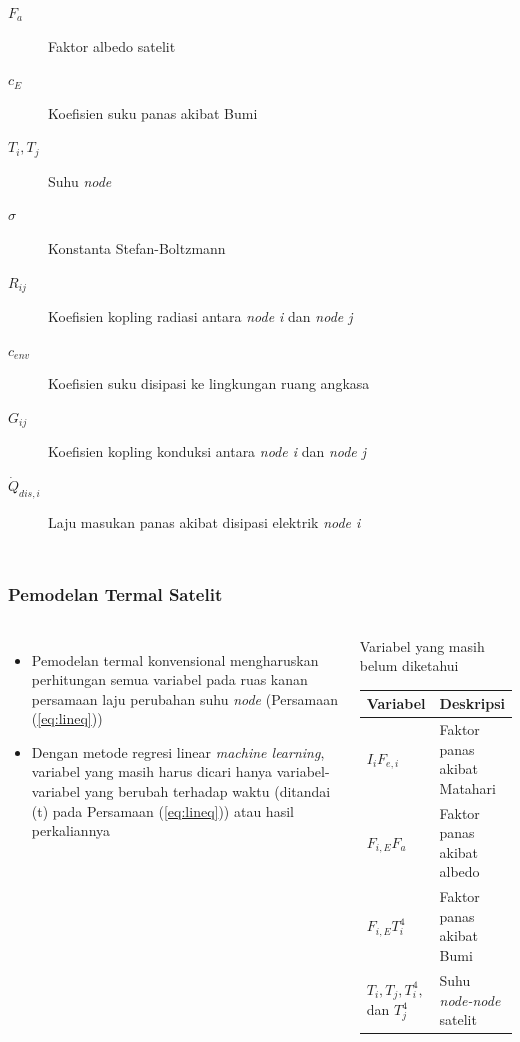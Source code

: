 \documentclass[8pt]{beamer}
\begin{document}
\begin{frame}
\begin{columns}[T]
\begin{description}
        \item[$F_{a}$] Faktor albedo satelit 
        \item[$c_{E}$] Koefisien suku panas akibat Bumi
        \item[$T_{i}, T_{j}$] Suhu \textit{node}
        \item[$\sigma$] Konstanta Stefan-Boltzmann 
        \item[$R_{ij}$] Koefisien kopling radiasi antara \textit{node i} dan \textit{node j}
        \item[$c_{env}$] Koefisien suku disipasi ke lingkungan ruang angkasa
        \item[$G_{ij}$] Koefisien kopling konduksi antara \textit{node i} dan \textit{node j}
        \item[$\dot{Q}_{dis,i}$] Laju masukan panas akibat disipasi elektrik \textit{node i}

\end{description}
  \end{columns}
\end{frame}

\begin{frame}
  \frametitle{Pemodelan Termal Satelit}
  \begin{columns}[T]
    \begin{itemize}
      \item Pemodelan termal konvensional mengharuskan perhitungan semua variabel pada ruas kanan persamaan laju perubahan suhu \textit{node} (Persamaan (\ref{eq:lineq}))
      \item Dengan metode regresi linear \textit{machine learning}, variabel yang masih harus dicari hanya variabel-variabel yang berubah terhadap waktu (ditandai (t) pada Persamaan (\ref{eq:lineq})) atau hasil perkaliannya
    \end{itemize}
    \begin{block}{\center Variabel yang masih belum diketahui}
    \begin{table}[H]
\begin{center}
\begin{tabular}{|l|l|}
\hline
Variabel & Deskripsi \\ \hline
	$I_i F_{e,i}$        & Faktor panas akibat Matahari         \\ \hline
	$F_{i,E} F_a$        & Faktor panas akibat albedo         \\ \hline
	$F_{i,E} T_i^4$        & Faktor panas akibat Bumi         \\ \hline
	$T_i, T_j, T_i^4,$ dan $T_j^4$        & Suhu \textit{node-node} satelit         \\ \hline
\end{tabular}
\end{center}
\end{table}
    \end{block}
  \end{columns}
\end{frame}
\end{document}
